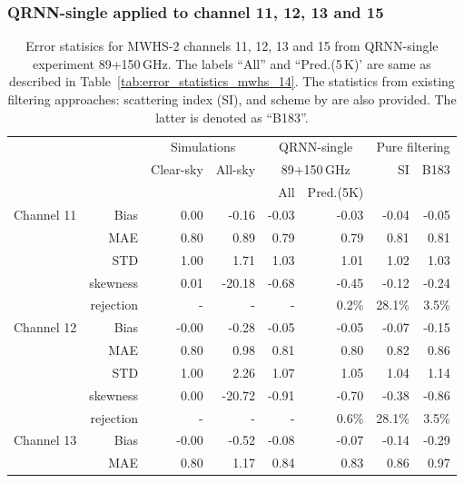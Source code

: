 \documentclass[amt, manuscript]{copernicus}
\begin{document}
\subsubsection{QRNN-single applied to channel 11, 12, 13 and 15}
\label{sec:mwhs_others}
\begin{table}[t]
	\caption{ Error statisics for MWHS-2 channels 11, 12, 13 and 15 from QRNN-single experiment 89+150\,GHz. The labels ``All'' and ``Pred.(5\,K)' are same as described in Table~\ref{tab:error_statistics_mwhs_14}. The statistics from existing filtering approaches: scattering index (SI), and scheme by \citet{buehler:aclou:07} are also provided. The latter is denoted as ``B183''.}
	\label{tab:error_statistics_mwhs_others}
	\begin{tabular}{lrrr|rr|rr}
		\tophline
		&&\multicolumn{2}{c|}{Simulations}& \multicolumn{2}{c|}{QRNN-single} & \multicolumn{2}{c}{Pure filtering} \\
		\cline{2-8}
		& &  Clear-sky &   All-sky &  \multicolumn{2}{c|}{89+150\,GHz}    & SI & B183  \\
		&	&		   &			& All & Pred.(5K) &&\\
		\middlehline
		Channel 11  &   Bias      & 0.00 &  -0.16 & -0.03 & -0.03		 &-0.04	& -0.05 \\
				    &	MAE       & 0.80 &   0.89 &  0.79 &  0.79  		 & 0.81	&  0.81 \\
					&	STD       & 1.00 &   1.71 &  1.03 &  1.01 		 & 1.02	&  1.03 \\
					&	skewness  & 0.01 & -20.18 & -0.68 & -0.45 		 &-0.12 & -0.24 \\
					& rejection   & -    & -      & -	  & 0.2\%        & 28.1\% & 3.5\%  \\
		\middlehline
		Channel 12  & Bias      & -0.00 &  -0.28 & -0.05 & -0.05		&  -0.07 & -0.15 \\
					& MAE       &  0.80 &   0.98 &  0.81 &  0.80  		&   0.82 &	0.86 \\
					& STD       &  1.00 &   2.26 &  1.07 &  1.05  		&  1.04  &  1.14 \\
					& skewness  &  0.00 & -20.72 & -0.91 & -0.70  		&  -0.38 & -0.86 \\
					& rejection & -    & -      & -	  & 0.6\%        & 28.1\% & 3.5\%  \\
		\middlehline
		Channel 13  & Bias      & -0.00 &  -0.52 & -0.08 & -0.07 		& -0.14  & -0.29 \\
					& MAE       &  0.80 &   1.17 &  0.84 &  0.83  		&  0.86  &  0.97 \\

\end{tabular}
\end{table}
\end{document}
